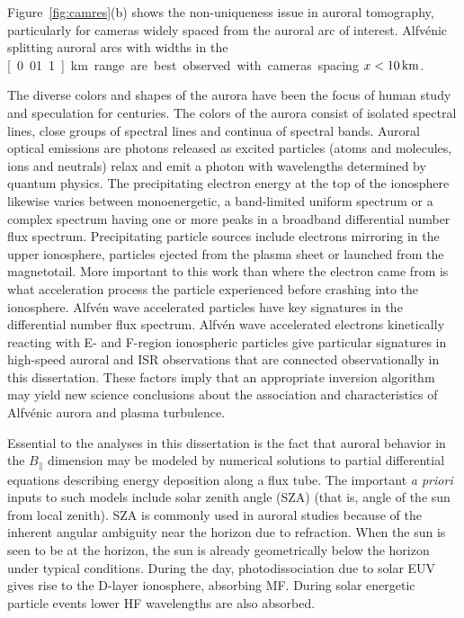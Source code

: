 Figure~\ref{fig:camres}(b) shows the non-uniqueness issue in auroral tomography, particularly for cameras widely spaced from the auroral arc of interest.
Alfvénic splitting auroral arcs with widths in the \unit[0.01..1]{km} range are best observed with cameras spacing $x < \unit[10]{km}$.

The diverse colors and shapes of the aurora have been the focus of human study and speculation for centuries.
The colors of the aurora consist of isolated spectral lines, close groups of spectral lines and continua of spectral bands.
Auroral optical emissions are photons released as excited particles (atoms and molecules, ions and neutrals) relax and emit a photon with wavelengths determined by quantum physics.
The precipitating electron energy at the top of the ionosphere likewise varies between monoenergetic, a band-limited uniform spectrum or a complex spectrum having one or more peaks in a broadband differential number flux spectrum.
Precipitating particle sources include electrons mirroring in the upper ionosphere, particles ejected from the plasma sheet or launched from the magnetotail.
More important to this work than where the electron came from is what acceleration process the particle experienced before crashing into the ionosphere.
Alfvén wave accelerated particles have key signatures in the differential number flux spectrum.
Alfvén wave accelerated electrons kinetically reacting with E- and F-region ionospheric particles give particular signatures in high-speed auroral and ISR observations that are connected observationally in this dissertation.
These factors imply that an appropriate inversion algorithm may yield new science conclusions about the association and characteristics of Alfvénic aurora and plasma turbulence.

Essential to the analyses in this dissertation is the fact that auroral behavior in the $B_\parallel$ dimension may be modeled by numerical solutions to partial differential equations describing energy deposition along a flux tube.
The important \textit{a priori} inputs to such models include solar zenith angle (SZA) (that is, angle of the sun from local zenith).
SZA is commonly used in auroral studies because of the inherent angular ambiguity near the horizon due to refraction. 
When the sun is seen to be at the horizon, the sun is already geometrically below the horizon under typical conditions.
During the day, photodissociation due to solar EUV gives rise to the D-layer ionosphere, absorbing MF.
During solar energetic particle events lower HF wavelengths are also absorbed.

